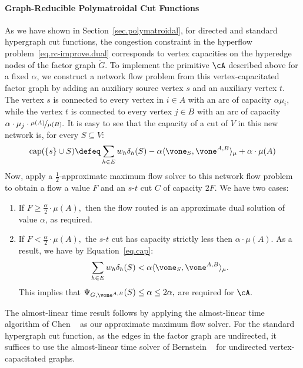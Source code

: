 \documentclass[letterpaper]{article}
\begin{document}
\paragraph{Graph-Reducible Polymatroidal Cut Functions}
As we have shown in Section~\ref{sec.polymatroidal},
for directed and standard hypergraph cut functions, the congestion constraint in the hyperflow problem~\ref{eq.rc-improve.dual} corresponds to vertex capacities on the hyperedge nodes of the factor graph $\tilde{G}.$ To implement the primitive $\cA$ described above for a fixed $\alpha$, we construct a network flow problem from this vertex-capacitated factor graph by adding an auxiliary source vertex $s$ and an auxiliary vertex $t$. The vertex $s$ is connected to every vertex in $i \in A$ with an arc of capacity $\alpha \mu_i$, while the vertex $t$ is connected to every vertex $j \in B$ with an arc of capacity $\alpha \cdot \mu_j \cdot \nicefrac{\mu(A)}{\mu(B)}.$ It is easy to see that the capacity of a cut of $V$ in this new network is, for every $S \subseteq V$:
\begin{equation}
\label{eq.cap}
\operatorname{cap}(\{s\} \cup S) \defeq \sum_{h \in E} w_h \delta_h(S) - \alpha \langle \vone_S, \vone^{A,B} \rangle_{\mu} + \alpha \cdot \mu(A)
\end{equation}
Now, apply a $\frac{1}{2}$-approximate maximum flow solver to this network flow problem to obtain a flow a value $F$ and an $s$-$t$ cut $C$ of capacity $2F.$ We have two cases:
\begin{enumerate}
    \item If $F \geq \frac{\alpha}{2} \cdot \mu(A),$ then the flow routed  is an approximate dual solution of value $\alpha$, as required.
    \item If $F <\frac{\alpha}{2} \cdot \mu(A),$ the $s$-$t$ cut has capacity strictly less then $\alpha \cdot \mu(A).$ As a result, we have by Equation~\ref{eq.cap}:
    $$
   \sum_{h \in E} w_h \delta_h(S) < \alpha \langle \vone_S, \vone^{A,B} \rangle_{\mu}.
    $$
    This implies that $\Psi_{G,\vone^{A,B}}(S) \leq \alpha \leq 2\alpha,$ are required for $\cA.$
\end{enumerate}
The almost-linear time result follows by applying the almost-linear time algorithm of Chen \etal~\cite{chenMaximumFlowMinimumCost2022} as our approximate maximum flow solver. For the standard hypergraph cut function, as the edges in the factor graph are undirected, it suffices to use the almost-linear time solver of Bernstein \etal~\cite{bernstein2022deterministic} for undirected vertex-capacitated graphs.
\end{document}
